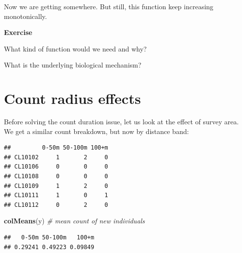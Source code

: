 \documentclass[12pt,]{book}
\newenvironment{Shaded}{\begin{snugshade}}{\end{snugshade}}
\newcommand{\CommentTok}[1]{\textcolor[rgb]{0.56,0.35,0.01}{\textit{#1}}}
\newcommand{\KeywordTok}[1]{\textcolor[rgb]{0.13,0.29,0.53}{\textbf{#1}}}
\newcommand{\NormalTok}[1]{#1}
\newcommand{\OperatorTok}[1]{\textcolor[rgb]{0.81,0.36,0.00}{\textbf{#1}}}
\newcommand{\StringTok}[1]{\textcolor[rgb]{0.31,0.60,0.02}{#1}}
\let\BeginKnitrBlock\begin \let\EndKnitrBlock\end
\begin{document}
Now we are getting somewhere. But still, this function keep
increasing monotonically.

\BeginKnitrBlock{rmdexercise}
\textbf{Exercise}

What kind of function would we need and why?

What is the underlying biological mechanism?
\EndKnitrBlock{rmdexercise}

\hypertarget{count-radius-effects}{%
\section{Count radius effects}\label{count-radius-effects}}

Before solving the count duration issue, let us look at the
effect of survey area.
We get a similar count breakdown, but now by distance band:

\begin{Shaded}
\end{Shaded}

\begin{verbatim}
##         0-50m 50-100m 100+m
## CL10102     1       2     0
## CL10106     0       0     0
## CL10108     0       0     0
## CL10109     1       2     0
## CL10111     1       0     1
## CL10112     0       2     0
\end{verbatim}

\begin{Shaded}
\begin{Highlighting}[]
\KeywordTok{colMeans}\NormalTok{(y) }\CommentTok{# mean count of new individuals}
\end{Highlighting}
\end{Shaded}

\begin{verbatim}
##   0-50m 50-100m   100+m 
## 0.29241 0.49223 0.09849
\end{verbatim}
\end{document}
